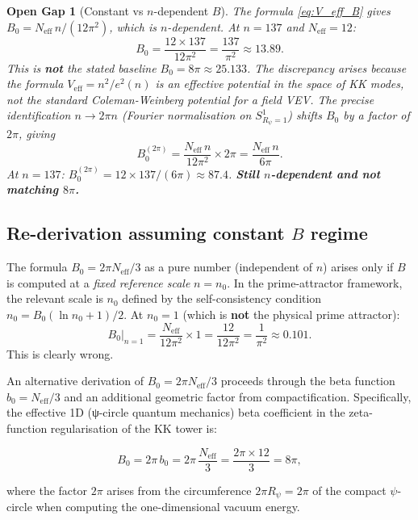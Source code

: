 \documentclass[11pt,a4paper]{article}
\newtheorem{gap}{Open Gap}
\begin{document}
\begin{gap}[Constant vs $n$-dependent $B$]
\label{gap:n_dependent}
The formula \eqref{eq:V_eff_B} gives $B_0 = N_\mathrm{eff}\,n/(12\pi^2)$, which
is $n$-\emph{dependent}.  At $n = 137$ and $N_\mathrm{eff} = 12$:
\[
  B_0 = \frac{12 \times 137}{12\pi^2} = \frac{137}{\pi^2} \approx 13.89.
\]
This is \textbf{not} the stated baseline $B_0 = 8\pi \approx 25.133$.
The discrepancy arises because the formula $V_\mathrm{eff} = n^2/e^2(n)$
is an effective potential in the space of KK modes, not the standard
Coleman-Weinberg potential for a field VEV.  The precise identification
$n \to 2\pi n$ (Fourier normalisation on $S^1_{R_\psi=1}$) shifts $B_0$ by a
factor of $2\pi$, giving
\[
  B_0^{(2\pi)} = \frac{N_\mathrm{eff}\,n}{12\pi^2} \times 2\pi
               = \frac{N_\mathrm{eff}\,n}{6\pi}.
\]
At $n = 137$: $B_0^{(2\pi)} = 12 \times 137/(6\pi) \approx 87.4$.
\textbf{Still $n$-dependent and not matching $8\pi$.}
\end{gap}

\subsection{Re-derivation assuming constant $B$ regime}

The formula $B_0 = 2\pi N_\mathrm{eff}/3$ as a pure number (independent of $n$)
arises only if $B$ is computed at a \emph{fixed reference scale} $n = n_0$.
In the prime-attractor framework, the relevant scale is $n_0$ defined by the
self-consistency condition $n_0 = B_0(\ln n_0 + 1)/2$.  At $n_0 = 1$ (which is
\textbf{not} the physical prime attractor):
\[
  B_0\big|_{n=1} = \frac{N_\mathrm{eff}}{12\pi^2} \times 1 = \frac{12}{12\pi^2}
  = \frac{1}{\pi^2} \approx 0.101.
\]
This is clearly wrong.

\medskip
\noindent
An alternative derivation of $B_0 = 2\pi N_\mathrm{eff}/3$ proceeds through the
beta function $b_0 = N_\mathrm{eff}/3$ and an additional geometric factor from
compactification.  Specifically, the effective 1D (ψ-circle quantum mechanics)
beta coefficient in the zeta-function regularisation of the KK tower is:

\begin{equation}
  \label{eq:B0_zeta}
  B_0 = 2\pi\,b_0 = 2\pi\,\frac{N_\mathrm{eff}}{3} = \frac{2\pi \times 12}{3} = 8\pi,
\end{equation}

where the factor $2\pi$ arises from the circumference $2\pi R_\psi = 2\pi$ of
the compact $\psi$-circle when computing the one-dimensional vacuum energy.
\end{document}
